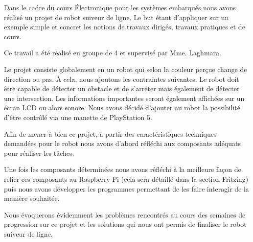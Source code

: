 Dans le cadre du cours Électronique pour les systèmes embarqués nous avons réalisé un projet de robot suiveur de ligne. Le but étant d'appliquer sur un exemple simple et concret les notions de travaux dirigés, travaux pratiques et de cours.

Ce travail a été réalisé en groupe de 4 et supervisé par Mme. Laghmara.

Le projet consiste globalement en un robot qui selon la couleur perçue change de direction ou pas. À cela, nous ajoutons les contraintes suivantes. Le robot doit être capable de détecter un obstacle et de s'arrêter mais également de détecter une intersection. Les informations importantes seront également affichées sur un écran LCD ou alors sonore. Nous avons décidé d'ajouter au robot la possibilité d'être contrôlé via une manette de PlayStation 5.

Afin de mener à bien ce projet, à partir des caractéristiques techniques demandées pour le robot nous avons d'abord réfléchi aux composants adéquats pour réaliser les tâches.

Une fois les composants déterminées nous avons réfléchi à la meilleure façon de relier ces composants au Raspberry Pi (cela sera détaillé dans la section Fritzing) puis nous avons développer les programmes permettant de les faire interagir de la manière souhaitée.

Nous évoquerons évidemment les problèmes rencontrés au cours des semaines de progression sur ce projet et les solutions qui nous ont permis de finaliser le robot suiveur de ligne.